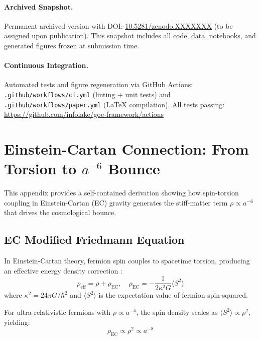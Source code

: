 \documentclass[12pt]{article}
\begin{document}
\paragraph{Archived Snapshot.}
Permanent archived version with DOI: \href{https://doi.org/10.5281/zenodo.XXXXXXX}{10.5281/zenodo.XXXXXXX} (to be assigned upon publication). This snapshot includes all code, data, notebooks, and generated figures frozen at submission time.

\paragraph{Continuous Integration.}
Automated tests and figure regeneration via GitHub Actions: \texttt{.github/workflows/ci.yml} (linting + unit tests) and \texttt{.github/workflows/paper.yml} (LaTeX compilation). All tests passing: \url{https://github.com/infolake/goe-framework/actions}

\appendix

\section{Einstein-Cartan Connection: From Torsion to $a^{-6}$ Bounce}
\label{app:einstein_cartan}

This appendix provides a self-contained derivation showing how spin-torsion coupling in Einstein-Cartan (EC) gravity generates the stiff-matter term $\rho \propto a^{-6}$ that drives the cosmological bounce.

\subsection{EC Modified Friedmann Equation}

In Einstein-Cartan theory, fermion spin couples to spacetime torsion, producing an effective energy density correction \cite{poplawski2010cosmology}:
\begin{equation}
\rho_{\text{eff}} = \rho + \rho_{\text{EC}}, \quad \rho_{\text{EC}} = -\frac{1}{2\kappa^2 G} \langle S^2 \rangle
\end{equation}
where $\kappa^2 = 24\pi G/\hbar^2$ and $\langle S^2 \rangle$ is the expectation value of fermion spin-squared.

For ultra-relativistic fermions with $\rho \propto a^{-4}$, the spin density scales as $\langle S^2 \rangle \propto \rho^2$, yielding:
\begin{equation}
\rho_{\text{EC}} \propto \rho^2 \propto a^{-8}
\end{equation}
\end{document}
